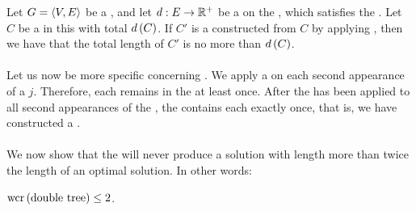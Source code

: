 \begin{lemma}
Let $G=\left\langle V,E \right\rangle$ be a , and let $d:E\rightarrow \mathbb{R}^+$ be a  on the , which satisfies the . Let $C$ be a  in this  with total  $d\left( C \right)$. If $C'$ is a  constructed from $C$ by applying , then we have that the total length of $C'$ is no more than $d\left( C \right)$.
\end{lemma}

\paragraph{}
Let us now be more specific concerning . We apply a  on each second appearance of a  $j$. Therefore, each  remains in the  at least once. After the  has been applied to all second appearances of the , the  contains each  exactly once, that is, we have constructed a .



\paragraph{}
We now show that the  will never produce a solution with length more than twice the length of an optimal solution. In other words:
\begin{theorem}
$\mbox{wcr}\left( \mbox{double tree} \right)\leq2$.
\end{theorem}

